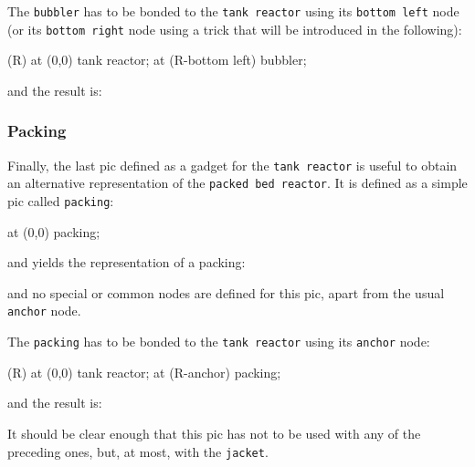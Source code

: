 \documentclass[12pt]{article}						%
\newcommand*{\chpn}[1]{\texttt{#1}}				%
\newcommand*{\chpp}[1]{\texttt{#1}}				%
\begin{document}
The \chpp{bubbler} has to be bonded to the \chpp{tank reactor} using its
\chpn{bottom left} node (or its \chpn{bottom right} node using a trick that will
be introduced in the following):
\begin{chpcode}
	\pic (R) at (0,0) {tank reactor};
	\pic at (R-bottom left) bubbler;
\end{chpcode}
and the result is:
\begin{center}
\end{center}

\subsubsection{Packing}

Finally, the last pic defined as a gadget for the \chpp{tank reactor} is useful
to obtain an alternative representation of the \chpp{packed bed reactor}.
It is defined as a simple pic called \chpp{packing}:
\begin{chpcode}
	\pic at (0,0) {packing};
\end{chpcode}
and yields the representation of a packing:
\begin{center}
\end{center}
and no special or common nodes are defined for this pic, apart from the usual
\chpn{anchor} node.

The \chpp{packing} has to be bonded to the \chpp{tank reactor} using its
\chpn{anchor} node:
\begin{chpcode}
	\pic (R) at (0,0) {tank reactor};
	\pic at (R-anchor) {packing};
\end{chpcode}
and the result is:
\begin{center}
\end{center}
It should be clear enough that this pic has not to be used with any of the
preceding ones, but, at most, with the \chpp{jacket}.
\end{document}

